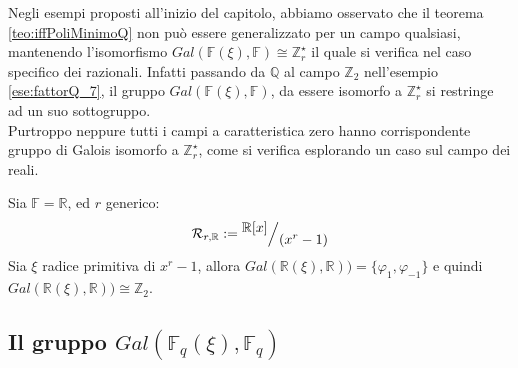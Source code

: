 Negli esempi proposti all'inizio del capitolo, abbiamo osservato che il teorema \ref{teo:iffPoliMinimoQ} non può essere generalizzato per un campo qualsiasi, mantenendo l'isomorfismo $Gal(\mathbb{F}(\xi), \mathbb{F}) \cong  \mathbb{Z}_{r}^{\star}$ il quale si verifica nel caso specifico dei razionali. Infatti passando da $\mathbb{Q}$ al campo $\mathbb{Z}_{2}$ nell'esempio \ref{ese:fattorQ_7}, il gruppo $Gal(\mathbb{F}(\xi), \mathbb{F})$, da essere isomorfo a $\mathbb{Z}_{r}^{\star}$ si restringe ad un suo sottogruppo. \\
Purtroppo neppure tutti i campi a caratteristica zero hanno corrispondente gruppo di Galois isomorfo a $\mathbb{Z}_{r}^{\star}$, come si verifica esplorando un caso sul campo dei reali.
\begin{esempio}
Sia $\mathbb{F}=\mathbb{R}$, ed $r$ generico: 
\begin{align*}
  \mathcal{R}_{r, \mathbb{R}} 
       := \quotient{\mathbb{R} \lbrack x \rbrack  }{(x^{r} - 1)} 
\end{align*}
Sia $\xi$ radice primitiva di $x^r-1$, allora $Gal(\mathbb{R}(\xi), \mathbb{R})) = \lbrace \varphi_{1}, \varphi_{-1} \rbrace $ e quindi $Gal(\mathbb{R}(\xi), \mathbb{R})) \cong \mathbb{Z}_{2}$.
\end{esempio}

\subsection{Il gruppo $Gal(\mathbb{F}_{q}(\xi), \mathbb{F}_{q})$} \label{cap2:Gfiniti}

